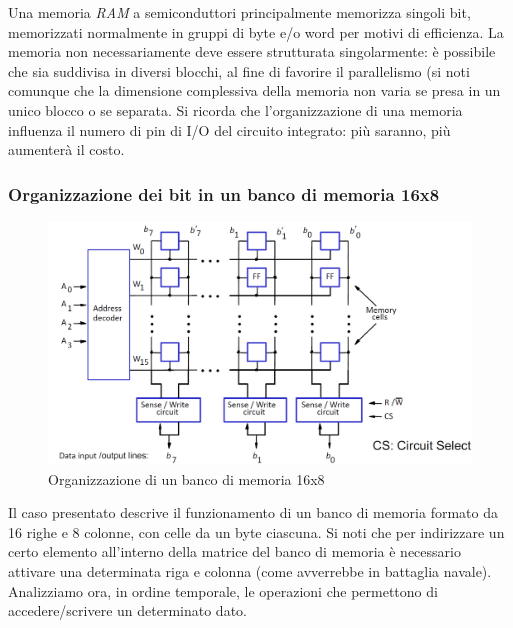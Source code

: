 \documentclass[class=book, crop=false, oneside]{standalone}
\begin{document}
Una memoria \emph{RAM} a semiconduttori principalmente memorizza singoli bit, memorizzati normalmente in gruppi di byte e/o word per motivi di efficienza. La memoria non necessariamente deve essere strutturata singolarmente: è possibile che sia suddivisa in diversi blocchi, al fine di favorire il parallelismo (si noti comunque che la dimensione complessiva della memoria non varia se presa in un unico blocco o se separata. Si ricorda che l'organizzazione di una memoria influenza il numero di pin di I/O del circuito integrato: più saranno, più aumenterà il costo.

\subsubsection{Organizzazione dei bit in un banco di memoria 16x8}
\begin{figure}[H]
	\centering
	\includegraphics[width=\textwidth,keepaspectratio]{organizzazione.png}
	\caption{Organizzazione di un banco di memoria 16x8}
\end{figure}
Il caso presentato descrive il funzionamento di un banco di memoria formato da 16 righe e 8 colonne, con celle da un byte ciascuna. Si noti che per indirizzare un certo elemento all'interno della matrice del banco di memoria è necessario attivare una determinata riga e colonna (come avverrebbe in battaglia navale). Analizziamo ora, in ordine temporale, le operazioni che permettono di accedere/scrivere un determinato dato.
\end{document}
